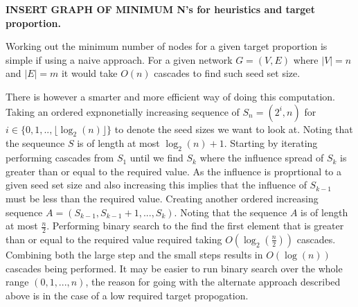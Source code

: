 \documentclass{article}
\begin{document}



\textbf{INSERT GRAPH OF MINIMUM N's for heuristics and target proportion.}

Working out the minimum number of nodes for a given target proportion is simple if using a naive approach.
For a given network $G = (V,E)$ where $|V|=n$ and $|E|=m$ it would take $O(n)$ cascades to find such seed set size.

There is however a smarter and more efficient way of doing this computation.
Taking an ordered expnonetially increasing sequence of $S_n = (2^i, n)$ for $i \in \{0, 1, ..,  \lfloor \log_2{(n)} \rfloor  \}$ to denote the seed sizes we want to look at.
Noting that the sequeunce $S$ is of length at most $\log_2(n) + 1$.
Starting by iterating performing cascades from $S_1$ until we find $S_k$ where the influence spread of $S_k$ is greater than or equal to the required value.
As the influence is proprtional to a given seed set size and also increasing this implies that the influence of $S_{k-1}$ must be less than the required value.
Creating another ordered increasing sequence $A = (S_{k-1}, S_{k-1} + 1, ..., S_{k})$.
Noting that the sequence $A$ is of length at most $\frac{n}{2}$.
Performing binary search to the find the first element that is greater than or equal to the required value required taking $O(\log_2(\frac{n}{2}))$ cascades.
Combining both the large step and the small steps results in $O(\log(n))$ cascades being performed.
It may be easier to run binary search over the whole range $(0, 1, ..., n)$, the reason for going with the alternate approach described above is in the case of a low required target propogation.
\end{document}
